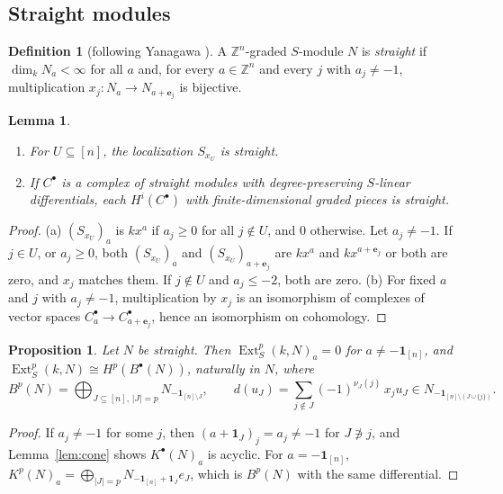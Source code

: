 \documentclass[11pt]{article}
\theoremstyle{plain}
\newtheorem{lemma}[theorem]{Lemma}
\newtheorem{proposition}[theorem]{Proposition}
\theoremstyle{definition}
\newtheorem{definition}[theorem]{Definition}
\newcommand{\kk}{k}
\newcommand{\ZZ}{\mathbb{Z}}
\newcommand{\Ext}{\operatorname{Ext}}
\newcommand{\one}{\mathbf 1}
\begin{document}
\subsection{Straight modules}

\begin{definition}[following Yanagawa \cite{Yanagawa2001}]
A $\ZZ^n$-graded $S$-module $N$ is \emph{straight} if $\dim_\kk N_a<\infty$ for all $a$ and, for every
$a\in\ZZ^n$ and every $j$ with $a_j\neq-1$, multiplication $x_j\colon N_a\to N_{a+\mathbf e_j}$ is bijective.
\end{definition}

\begin{lemma}\label{lem:straight}
\begin{enumerate}[label=\textup{(\alph*)},nosep]
\item For $U\subseteq[n]$, the localization $S_{x_U}$ is straight.
\item If $C^\bullet$ is a complex of straight modules with degree-preserving $S$-linear differentials, each
$H^i(C^\bullet)$ with finite-dimensional graded pieces is straight.
\end{enumerate}
\end{lemma}

\begin{proof}
(a) $(S_{x_U})_a$ is $\kk x^a$ if $a_j\ge0$ for all $j\notin U$, and $0$ otherwise. Let $a_j\neq-1$. If $j\in U$,
or $a_j\ge0$, both $(S_{x_U})_a$ and $(S_{x_U})_{a+\mathbf e_j}$ are $\kk x^a$ and $\kk x^{a+\mathbf e_j}$ or
both are zero, and $x_j$ matches them. If $j\notin U$ and $a_j\le-2$, both are zero.
(b) For fixed $a$ and $j$ with $a_j\ne-1$, multiplication by $x_j$ is an isomorphism of complexes of vector
spaces $C^\bullet_a\to C^\bullet_{a+\mathbf e_j}$, hence an isomorphism on cohomology.
\end{proof}

\begin{proposition}\label{prop:straight-ext}
Let $N$ be straight. Then $\Ext^p_S(\kk,N)_a=0$ for $a\neq-\one_{[n]}$, and
$\Ext^p_S(\kk,N)\cong H^p(B^\bullet(N))$, naturally in $N$, where
\[
B^p(N)=\bigoplus_{J\subseteq[n],\,|J|=p}N_{-\one_{[n]\setminus J}},\qquad
d(u_J)=\sum_{j\notin J}(-1)^{\nu_J(j)}\,x_ju_J\in N_{-\one_{[n]\setminus(J\cup\{j\})}}.
\]
\end{proposition}

\begin{proof}
If $a_j\neq-1$ for some $j$, then $(a+\one_J)_j=a_j\ne-1$ for $J\not\ni j$, and Lemma~\ref{lem:cone} shows
$K^\bullet(N)_a$ is acyclic. For $a=-\one_{[n]}$, $K^p(N)_a=\bigoplus_{|J|=p}N_{-\one_{[n]}+\one_J}e_J$, which is
$B^p(N)$ with the same differential.
\end{proof}
\end{document}
